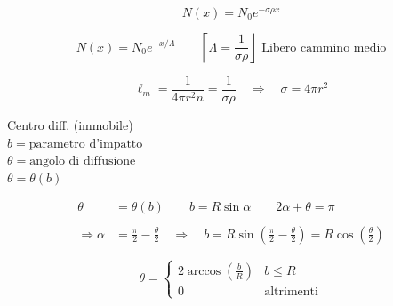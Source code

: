 \documentclass[12pt,a4paper]{article}
\begin{document}
\begin{equation*}
    \boxed{ N(x) = N_0 e^{-\sigma \rho x} }
\end{equation*}

\newpage
\begin{equation*}
    N(x) = N_0 e^{-x/\Lambda} \qquad \left\lceil \Lambda = \frac{1}{\sigma \rho} \right\rfloor \text{ Libero cammino medio}
\end{equation*}

\begin{equation*}
    \ell_m = \frac{1}{4\pi r^2 n} = \frac{1}{\sigma \rho} \quad \Rightarrow \quad \sigma = 4\pi r^2
\end{equation*}


\vspace{0.8cm}

\noindent Centro diff. (immobile) \\
$b = \text{parametro d'impatto}$ \\
$\theta = \text{angolo di diffusione}$ \\
$\theta = \theta(b)$

\vspace{0.5cm}

\begin{align*}
    \theta &= \theta(b) \qquad b = R \sin \alpha \qquad 2\alpha + \theta = \pi \\
    \\
    \Rightarrow \alpha &= \frac{\pi}{2} - \frac{\theta}{2} \quad \Rightarrow \quad b = R \sin\left(\frac{\pi}{2} - \frac{\theta}{2}\right) = R \cos\left(\frac{\theta}{2}\right)
\end{align*}

\begin{equation*}
    \theta = \begin{cases}
        2 \arccos\left(\frac{b}{R}\right) & b \le R \\
        0 & \text{altrimenti}
    \end{cases}
\end{equation*}
\end{document}
